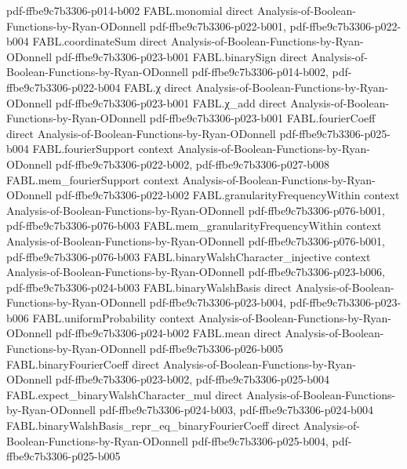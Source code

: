 \begin{theorem}
  {pdf-ffbe9c7b3306-p014-b002}
\proofstep
  {FABL.monomial}
  {direct}
  {Analysis-of-Boolean-Functions-by-Ryan-ODonnell}
  {pdf-ffbe9c7b3306-p022-b001,
    pdf-ffbe9c7b3306-p022-b004}
\proofstep
  {FABL.coordinateSum}
  {direct}
  {Analysis-of-Boolean-Functions-by-Ryan-ODonnell}
  {pdf-ffbe9c7b3306-p023-b001}
\proofstep
  {FABL.binarySign}
  {direct}
  {Analysis-of-Boolean-Functions-by-Ryan-ODonnell}
  {pdf-ffbe9c7b3306-p014-b002,
    pdf-ffbe9c7b3306-p022-b004}
\proofstep
  {FABL.χ}
  {direct}
  {Analysis-of-Boolean-Functions-by-Ryan-ODonnell}
  {pdf-ffbe9c7b3306-p023-b001}
\proofstep
  {FABL.χ_add}
  {direct}
  {Analysis-of-Boolean-Functions-by-Ryan-ODonnell}
  {pdf-ffbe9c7b3306-p023-b001}
\proofstep
  {FABL.fourierCoeff}
  {direct}
  {Analysis-of-Boolean-Functions-by-Ryan-ODonnell}
  {pdf-ffbe9c7b3306-p025-b004}
\proofstep
  {FABL.fourierSupport}
  {context}
  {Analysis-of-Boolean-Functions-by-Ryan-ODonnell}
  {pdf-ffbe9c7b3306-p022-b002,
    pdf-ffbe9c7b3306-p027-b008}
\proofstep
  {FABL.mem_fourierSupport}
  {context}
  {Analysis-of-Boolean-Functions-by-Ryan-ODonnell}
  {pdf-ffbe9c7b3306-p022-b002}
\proofstep
  {FABL.granularityFrequencyWithin}
  {context}
  {Analysis-of-Boolean-Functions-by-Ryan-ODonnell}
  {pdf-ffbe9c7b3306-p076-b001,
    pdf-ffbe9c7b3306-p076-b003}
\proofstep
  {FABL.mem_granularityFrequencyWithin}
  {context}
  {Analysis-of-Boolean-Functions-by-Ryan-ODonnell}
  {pdf-ffbe9c7b3306-p076-b001,
    pdf-ffbe9c7b3306-p076-b003}
\proofstep
  {FABL.binaryWalshCharacter_injective}
  {context}
  {Analysis-of-Boolean-Functions-by-Ryan-ODonnell}
  {pdf-ffbe9c7b3306-p023-b006,
    pdf-ffbe9c7b3306-p024-b003}
\proofstep
  {FABL.binaryWalshBasis}
  {direct}
  {Analysis-of-Boolean-Functions-by-Ryan-ODonnell}
  {pdf-ffbe9c7b3306-p023-b004,
    pdf-ffbe9c7b3306-p023-b006}
\proofstep
  {FABL.uniformProbability}
  {context}
  {Analysis-of-Boolean-Functions-by-Ryan-ODonnell}
  {pdf-ffbe9c7b3306-p024-b002}
\proofstep
  {FABL.mean}
  {direct}
  {Analysis-of-Boolean-Functions-by-Ryan-ODonnell}
  {pdf-ffbe9c7b3306-p026-b005}
\proofstep
  {FABL.binaryFourierCoeff}
  {direct}
  {Analysis-of-Boolean-Functions-by-Ryan-ODonnell}
  {pdf-ffbe9c7b3306-p023-b002,
    pdf-ffbe9c7b3306-p025-b004}
\proofstep
  {FABL.expect_binaryWalshCharacter_mul}
  {direct}
  {Analysis-of-Boolean-Functions-by-Ryan-ODonnell}
  {pdf-ffbe9c7b3306-p024-b003,
    pdf-ffbe9c7b3306-p024-b004}
\proofstep
  {FABL.binaryWalshBasis_repr_eq_binaryFourierCoeff}
  {direct}
  {Analysis-of-Boolean-Functions-by-Ryan-ODonnell}
  {pdf-ffbe9c7b3306-p025-b004,
    pdf-ffbe9c7b3306-p025-b005}
\proofstep

\end{theorem}
